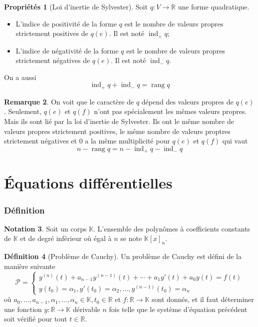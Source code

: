 \documentclass[11pt,a4paper]{article}
\theoremstyle{definition}
\newtheorem{mydef}{Définition}%
\newtheorem{mynota}[mydef]{Notation}
\newtheorem{myprop}[mydef]{Propriétés}
\newtheorem{myrem}[mydef]{Remarque}
\DeclareMathOperator{\ind}{ind}
\DeclareMathOperator{\newrang}{rang}
\newcommand{\R}{\mathbb{R}}
\newcommand{\K}{\mathbb{K}}
\begin{document}
\begin{myprop}[Loi d'inertie de Sylvester]
	Soit $q: V \to \R$ une forme quadratique.
	\begin{itemize}
		\item L'indice de positivité de la forme $q$ est le nombre de valeurs propres strictement positives de $q(e)$.
			Il est noté $\ind_+q$;
		\item L'indice de négativité de la forme $q$ est le nombre de valeurs propres strictement négatives de $q(e)$.
			Il est noté $\ind_-q$.
	\end{itemize}
	On a aussi
	\[ \ind_+q + \ind_-q = \newrang q \]
\end{myprop}

\begin{myrem}
	On voit que le caractère de $q$ dépend des valeurs propres de $q(e)$.
	Seulement, $q(e)$ et $q(f)$ n'ont pas spécialement les mêmes valeurs propres.
	Mais ils sont lié par la loi d'inertie de Sylvester.
	Ils ont le même nombre de valeurs propres strictement positives,
	le même nombre de valeurs proptres strictement négatives
	et 0 a la même multiplicité pour $q(e)$ et $q(f)$ qui vaut
	\[ n - \newrang q = n - \ind_+q - \ind_-q \]
\end{myrem}

\part{Équations différentielles}

\section{Définition}

\begin{mynota}
	Soit un corps $\K$.
	L'ensemble des polynômes à coefficients constants de $\K$ et de degré inférieur où égal à $n$ se note $\K[x]_n$.
\end{mynota}

\begin{mydef}[Problème de Cauchy]
	Un problème de Cauchy est défini de la manière suivante
	\[ \mathcal{P} = \left\{
	\begin{array}{l}
		y^{(n)}(t) + a_{n-1}y^{(n-1)}(t) + \cdots + a_1 y'(t) + a_0 y(t) = f(t) \\
		y(t_0) = \alpha_1, y'(t_0) = \alpha_2, \dots , y^{(n-1)}(t_0) = \alpha_n
	\end{array} \right.
	\]
	où $a_0, \dots, a_{n-1}, \alpha_1, \dots, \alpha_n \in \K, t_0 \in \R$ et $f: \R \to \K$ sont donnés,
	et il faut déterminer une fonction $y: \R \to \K$ dérivable $n$ fois
	telle que le système d'équation précédent soit vérifié pour tout $t \in \R$.
\end{mydef}
\end{document}
